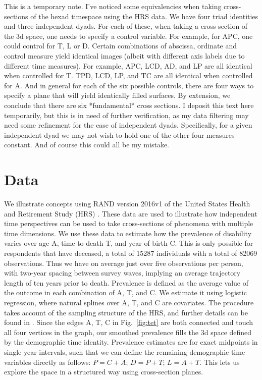 \documentclass{bmcart}
\begin{document}
This is a temporary note. I've noticed some equivalencies when taking cross-sections of the hexad timespace using the HRS data. We have four triad identities and three independent dyads. For each of these, when taking a cross-section of the 3d space, one needs to specify a control variable. For example, for APC, one could control for T, L or D. Certain combinations of abscissa, ordinate and control measure yield identical images (albeit with different axis labels due to different time measures). For example, APC, LCD, AD, and LP are all identical when controlled for T. TPD, LCD, LP, and TC are all identical when controlled for A. And in general for each of the six possible controls, there are four ways to specify a plane that will yield identically filled surfaces. By extension, we conclude that there are six *fundamental* cross sections. I deposit this text here temporarily, but this is in need of further verification, as my data filtering may need some refinement for the case of independent dyads. Specifically, for a given independent dyad we may not wish to hold one of the other four measures constant. And of course this could all be my mistake.


\section*{Data}
We illustrate concepts using RAND version 2016v1 of the United States Health and Retirement Study (HRS) \citep{HRS, RAND}. These data are used to illustrate how independent time perspectives can be used to take cross-sections of phenomena with multiple time dimensions. We use these data to estimate how the prevalence of disability varies over age A, time-to-death T, and year of birth C. This is only possible for respondents that have deceased, a total of 15287 individuals with a total of 82069 observations. Thus we have on average just over five observations per person, with two-year spacing between survey waves, implying an average trajectory length of ten years prior to death. Prevalence is defined as the average value of the outcome in each combination of A, T, and C. We estimate it using logistic regression, where natural splines over A, T, and C are covariates. The procedure takes account of the sampling structure of the HRS, and further details can be found in \citet{riffe2017hle}. Since the edges A, T, C in Fig.~\ref{fig:tet} are both connected and touch all four vertices in the graph, our smoothed prevalence fills the 3d space defined by the demographic time identity. Prevalence estimates are for exact midpoints in single year intervals, such that we can define the remaining demographic time variables directly as follows: $P = C + A$; $D = P + T$; $L = A + T$. This lets us explore the space in a structured way using cross-section planes.
\end{document}
